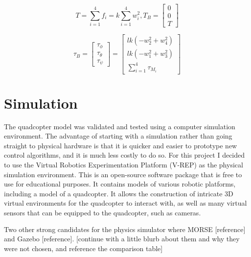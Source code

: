 \documentclass[letterpaper,12pt,titlepage,oneside,final]{book}
\begin{document}
\begin{center}
$$
T = \sum_{i=1}^{4} f_{i} = k\sum_{i=1}^{4} w^{2}_{i} , T_{B} = 
\begin{bmatrix}
0 \\
0 \\
T
\end{bmatrix}
$$

$$
\tau_{B} = 
\begin{bmatrix}
\tau_{\phi} \\
\tau_{\theta} \\
\tau_{\psi}
\end{bmatrix}
=
\begin{bmatrix}
lk(-w_{2}^{2}+w_{4}^{2}) \\
lk(-w_{1}^{2}+w_{3}^{2}) \\
\sum_{i=1}^{4}\tau_{M_{i}}
\end{bmatrix}
$$
\end{center}


\section{Simulation}


The quadcopter model was validated and tested using a computer simulation environment. 
The advantage of starting with a simulation rather than going straight to physical hardware is that it is quicker and easier to prototype new control algorithms, and it is much less costly to do so. 
For this project I decided to use the Virtual Robotics Experimentation Platform (V-REP)\cite{vrep} as the physical simulation environment.
This is an open-source software package that is free to use for educational purposes. 
It contains models of various robotic platforms, including a model of a quadcopter. 
It allows the construction of intricate 3D virtual environments for the quadcopter to interact with, as well as many virtual sensors that can be equipped to the quadcopter, such as cameras.

Two other strong candidates for the physics simulator where MORSE [reference] and Gazebo [reference]. 
[continue with a little blurb about them and why they were not chosen, and reference the comparison table]
\end{document}
